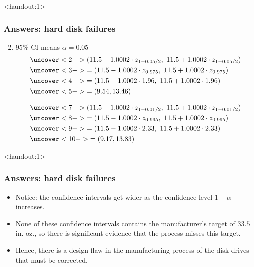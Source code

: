 \documentclass[handout]{beamer}\usepackage[]{graphicx}\usepackage[]{color}
\newcommand{\answers}{1}
\numberwithin{equation}{section}
\begin{document}
\begin{frame}<handout:\answers>
\frametitle{Answers: hard disk failures}
\begin{enumerate}[1. ]
\setcounter{enumi}{1}
\item $95\%$ CI means $\alpha = 0.05$
\begin{align*}
&\uncover<2->{(11.5 - 1.0002 \cdot z_{1 - 0.05/2}, \ 11.5 + 1.0002\cdot z_{1 - 0.05/2})} \\
&\uncover<3->{= (11.5 - 1.0002\cdot z_{0.975}, \ 11.5 + 1.0002 \cdot z_{0.975})} \\
&\uncover<4->{= (11.5 - 1.0002 \cdot 1.96, \ 11.5 + 1.0002 \cdot 1.96)} \\
&\uncover<5->{= (9.54, 13.46)}
\end{align*}

\begin{align*}
&\uncover<7->{(11.5 - 1.0002 \cdot z_{1 - 0.01/2}, \ 11.5 + 1.0002\cdot z_{1 - 0.01/2})} \\
&\uncover<8->{= (11.5 - 1.0002\cdot z_{0.995}, \ 11.5 + 1.0002 \cdot z_{0.995})} \\
&\uncover<9->{= (11.5 - 1.0002 \cdot 2.33, \ 11.5 + 1.0002 \cdot 2.33)} \\
&\uncover<10->{= (9.17, 13.83)}
\end{align*}
\end{enumerate}
\end{frame}

\begin{frame}<handout:\answers>
\frametitle{Answers: hard disk failures}
\begin{itemize}
\item Notice: the confidence intervals get wider as the confidence level $1- \alpha$ increases.
\pause \item None of these confidence intervals contains the manufacturer's target of $33.5$ in. oz., so there is significant evidence that the process misses this target. 
\pause \item Hence, there is a design flaw in the manufacturing process of the disk drives that must be corrected.
\end{itemize}
\end{frame}
\end{document}
